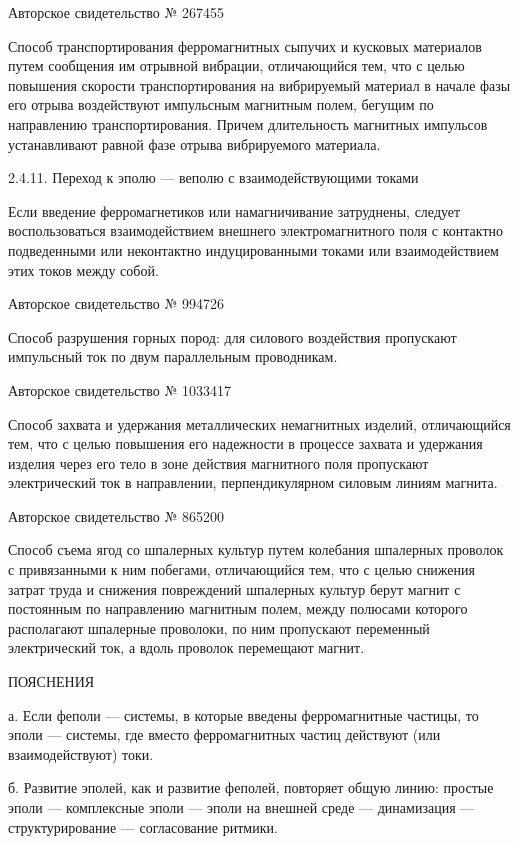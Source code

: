 Авторское свидетельство № 267455

Способ транспортирования ферромагнитных  сыпучих и кусковых материалов
путем сообщения  им отрывной вибрации,  отличающийся тем, что  с целью
повышения скорости транспортирования на  вибрируемый материал в начале
фазы его  отрыва воздействуют  импульсным магнитным полем,  бегущим по
направлению транспортирования. Причем длительность магнитных импульсов
устанавливают равной фазе отрыва вибрируемого материала.


2.4.11. Переход к эполю — веполю с взаимодействующими токами

Если введение  ферромагнетиков или намагничивание  затруднены, следует
воспользоваться  взаимодействием  внешнего  электромагнитного  поля  с
контактно  подведенными  или  неконтактно индуцированными  токами  или
взаимодействием этих токов между собой.


Авторское свидетельство № 994726

Способ разрушения  горных пород:  для силового  воздействия пропускают
импульсный ток по двум параллельным проводникам.


Авторское свидетельство № 1033417

Способ   захвата  и   удержания  металлических   немагнитных  изделий,
отличающийся  тем, что  с целью  повышения его  надежности в  процессе
захвата и удержания изделия через  его тело в зоне действия магнитного
поля  пропускают  электрический  ток в  направлении,  перпендикулярном
силовым линиям магнита.


Авторское  свидетельство  №  865200

Способ  съема  ягод со  шпалерных  культур  путем колебания  шпалерных
проволок с привязанными к ним  побегами, отличающийся тем, что с целью
снижения затрат  труда и снижения повреждений  шпалерных культур берут
магнит  с постоянным  по направлению  магнитным полем,  между полюсами
которого располагают шпалерные проволоки, по ним пропускают переменный
электрический ток, а вдоль проволок перемещают магнит.

ПОЯСНЕНИЯ

а. Если феполи — системы, в которые введены ферромагнитные частицы, то
эполи  —  системы, где  вместо  ферромагнитных  частиц действуют  (или
взаимодействуют) токи.

б. Развитие  эполей, как  и развитие  феполей, повторяет  общую линию:
простые  эполи  —  комплексные  эполи  —  эполи  на  внешней  среде  —
динамизация — структурирование — согласование ритмики.

